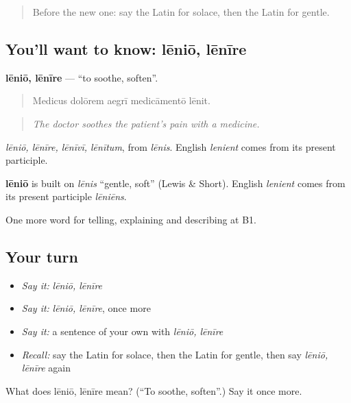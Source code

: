 \label{lesson:LA-C492-lenio}



\begin{quote}
Before the new one: say the Latin for solace, then the Latin for gentle.
\end{quote}

\subsection*{You'll want to know: lēniō, lēnīre}
\textbf{lēniō, lēnīre} — \textquotedblleft{}to soothe, soften\textquotedblright{}.

\begin{quote}
Medicus dolōrem aegrī medicāmentō lēnit.
\end{quote}

\begin{quote}
\emph{The doctor soothes the patient's pain with a medicine.}
\end{quote}

\emph{lēniō, lēnīre, lēnīvī, lēnītum}, from \emph{lēnis}. English \emph{lenient} comes from its present participle.

\begin{cousinweb}
\textbf{lēniō} is built on \emph{lēnis} \textquotedblleft{}gentle, soft\textquotedblright{} (Lewis \& Short). English \emph{lenient} comes from its present participle \emph{lēniēns}.
\end{cousinweb}

\begin{grammarlens}[title={What you've built}]
One more word for telling, explaining and describing at B1.
\end{grammarlens}

\subsection*{Your turn}
\begin{itemize}
\raggedright
  \item \emph{Say it:} \emph{lēniō, lēnīre}
  \item \emph{Say it:} \emph{lēniō, lēnīre}, once more
  \item \emph{Say it:} a sentence of your own with \emph{lēniō, lēnīre}
  \item \emph{Recall:} say the Latin for solace, then the Latin for gentle, then say \emph{lēniō, lēnīre} again
\end{itemize}

\begin{tcolorbox}[breakable,colback=teal!4,colframe=teal!35!black,title={Before you move on}]
What does lēniō, lēnīre mean? (\textquotedblleft{}To soothe, soften\textquotedblright{}.) Say it once more.
\end{tcolorbox}
